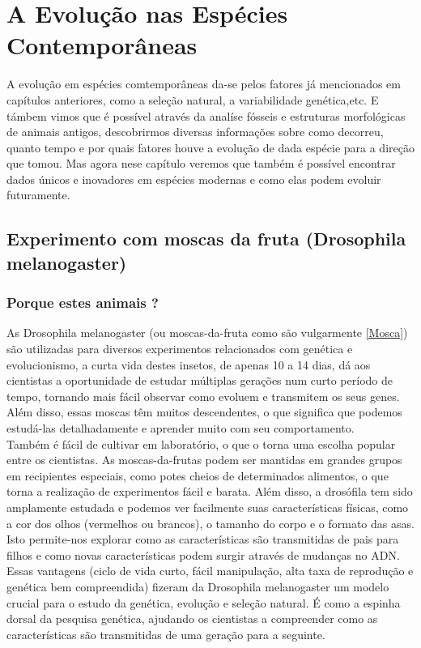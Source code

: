 \documentclass{report}
\begin{document}
\chapter{A Evolução nas Espécies Contemporâneas}\label{chap.Evolucao}

A evolução em espécies comtemporâneas da-se pelos fatores já mencionados em capítulos anteriores, como a seleção natural, a variabilidade genética,etc. E támbem vimos que é possível através da analíse fósseis e estruturas morfológicas de animais antigos, descobrirmos diversas informações sobre como decorreu, quanto tempo e por quais fatores houve a evolução de dada espécie para a direção que tomou. Mas agora nese capítulo veremos que também é possível encontrar dados únicos e inovadores em espécies modernas e como elas podem evoluir futuramente.

\section{Experimento com moscas da fruta (Drosophila melanogaster)}\label{sec.cont1}

\subsection{Porque estes animais ?}\label{subsec.cont1.1}

As Drosophila melanogaster (ou moscas-da-fruta como são vulgarmente \ref{Mosca}) são utilizadas para diversos experimentos relacionados com genética e evolucionismo, a curta vida destes insetos, de apenas 10 a 14 dias, dá aos cientistas a oportunidade de estudar múltiplas gerações num curto período de tempo, tornando mais fácil observar como evoluem e transmitem os seus genes. Além disso, essas moscas têm muitos descendentes, o que significa que podemos estudá-las detalhadamente e aprender muito com seu comportamento.\\ 
Também é fácil de cultivar em laboratório, o que o torna uma escolha popular entre os cientistas. As moscas-da-frutas podem ser mantidas em grandes grupos em recipientes especiais, como potes cheios de determinados alimentos, o que torna a realização de experimentos fácil e barata. Além disso, a drosófila tem sido amplamente estudada e podemos ver facilmente suas características físicas, como a cor dos olhos (vermelhos ou brancos), o tamanho do corpo e o formato das asas. Isto permite-nos explorar como as características são transmitidas de pais para filhos e como novas características podem surgir através de mudanças no ADN.\\
Essas vantagens (ciclo de vida curto, fácil manipulação, alta taxa de reprodução e genética bem compreendida) fizeram da Drosophila melanogaster um modelo crucial para o estudo da genética, evolução e seleção natural. É como a espinha dorsal da pesquisa genética, ajudando os cientistas a compreender como as características são transmitidas de uma geração para a seguinte.
\end{document}
